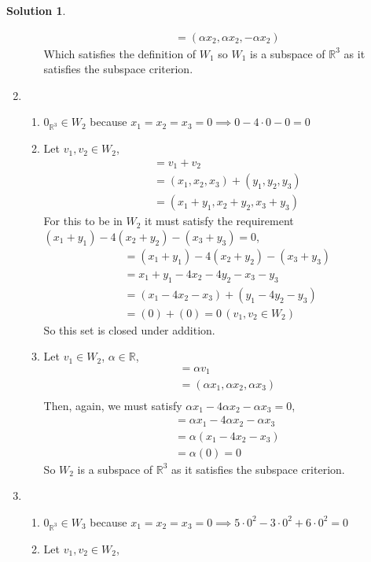 \documentclass[10pt]{article}
\theoremstyle{definition}
\newtheorem{soln}{Solution}
\begin{document}
\begin{soln}
\begin{enumerate}[label=(\alph*)]
\begin{enumerate}[label=(\roman*)]
\begin{align*}
      & = (\alpha x_2,\alpha x_2,-\alpha x_2)
    \end{align*}
    Which satisfies the definition of $W_1$ so $W_1$ is a subspace of $\mathbb{R}^3$ as it satisfies the subspace criterion.
  \end{enumerate}
  \item \begin{enumerate}[label=(\roman*)]
    \item $0_{\mathbb{R}^3}\in W_2$ because $x_1=x_2=x_3=0\implies 0-4\cdot0-0=0$
    \item Let $v_1,v_2\in W_2$,
    \begin{align*}
      & = v_1+v_2\\
      & = (x_1,x_2,x_3)+(y_1,y_2,y_3)\\
      & = (x_1+y_1,x_2+y_2,x_3+y_3)
    \end{align*}
    For this to be in $W_2$ it must satisfy the requirement $(x_1+y_1)-4(x_2+y_2)-(x_3+y_3)=0$,
    \begin{align*}
      & = (x_1+y_1)-4(x_2+y_2)-(x_3+y_3) \\
      & = x_1+y_1-4x_2-4y_2-x_3-y_3 \\
      & = (x_1-4x_2-x_3)+(y_1-4y_2-y_3) \\
      & = (0)+(0)=0 \, (v_1,v_2\in W_2)
    \end{align*}
    So this set is closed under addition.
    \item Let $v_1\in W_2$, $\alpha\in\mathbb{R}$,
    \begin{align*}
      & = \alpha v_1\\
      & = (\alpha x_1,\alpha x_2,\alpha x_3)\\
    \end{align*}
    Then, again, we must satisfy $\alpha x_1-4\alpha x_2-\alpha x_3=0$,
    \begin{align*}
      & = \alpha x_1-4\alpha x_2-\alpha x_3 \\
      & = \alpha(x_1-4 x_2- x_3) \\
      & = \alpha(0)=0
    \end{align*}
    So $W_2$ is a subspace of $\mathbb{R}^3$ as it satisfies the subspace criterion.
  \end{enumerate}
  \item \begin{enumerate}[label=(\roman*)]
    \item $0_{\mathbb{R}^3}\in W_3$ because $x_1=x_2=x_3=0\implies 5\cdot0^2-3\cdot0^2+6\cdot0^2=0$
    \item Let $v_1,v_2\in W_2$,

\end{enumerate}
\end{enumerate}
\end{soln}
\end{document}
